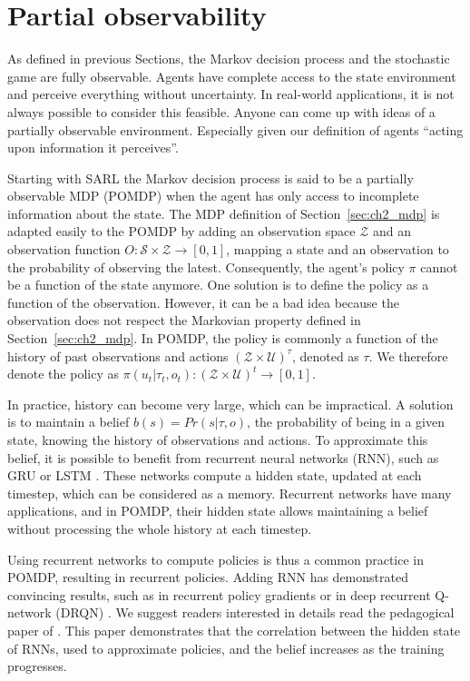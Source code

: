 \section{Partial observability} \label{sec:ch2_partial_observability}
As defined in previous Sections, the Markov decision process and the stochastic game are fully observable.
Agents have complete access to the state environment and perceive everything without uncertainty.
In real-world applications, it is not always possible to consider this feasible.
Anyone can come up with ideas of a partially observable environment.
Especially given our definition of agents ``acting upon information it perceives''.

Starting with SARL the Markov decision process is said to be a partially observable MDP (POMDP) \citep{KAELBLING199899} when the agent has only access to incomplete information about the state.
The MDP definition of Section~\ref{sec:ch2_mdp} is adapted easily to the POMDP by adding an observation space $\mathcal{Z}$ and an observation function $O:\mathcal{S} \times \mathcal{Z} \rightarrow [0, 1]$, mapping a state and an observation to the probability of observing the latest.
Consequently, the agent's policy $\pi$ cannot be a function of the state anymore.
One solution is to define the policy as a function of the observation.
However, it can be a bad idea because the observation does not respect the Markovian property defined in Section~\ref{sec:ch2_mdp}.
In POMDP, the policy is commonly a function of the history of past observations and actions $(\mathcal{Z} \times \mathcal{U})^\tau$, denoted as $\tau$.
We therefore denote the policy as $\pi(u_t|\tau_t,o_t): (\mathcal{Z} \times \mathcal{U})^t \rightarrow [0,1]$.

In practice, history can become very large, which can be impractical.
A solution is to maintain a belief $b(s)=Pr(s|\tau,o)$, the probability of being in a given state, knowing the history of observations and actions.
To approximate this belief, it is possible to benefit from recurrent neural networks (RNN), such as GRU \citep{Chung2014EmpiricalModeling} or LSTM \citep{Hochreiter1997LongMemory}.
These networks compute a hidden state, updated at each timestep, which can be considered as a memory.
Recurrent networks have many applications, and in POMDP, their hidden state allows maintaining a belief without processing the whole history at each timestep.

Using recurrent networks to compute policies is thus a common practice in POMDP, resulting in recurrent policies.
Adding RNN has demonstrated convincing results, such as in recurrent policy gradients \citep{wierstra2010recurrent} or in deep recurrent Q-network (DRQN) \citep{Hausknecht2015DeepMDPs}.
We suggest readers interested in details read the pedagogical paper of \cite{lambrechts2022recurrent}.
This paper demonstrates that the correlation between the hidden state of RNNs, used to approximate policies, and the belief increases as the training progresses.

